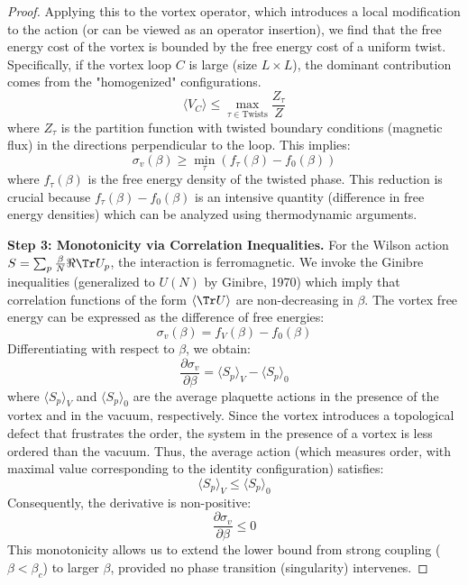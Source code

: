 \begin{proof}
Applying this to the vortex operator, which introduces a local modification to the action (or can be viewed as an operator insertion), we find that the free energy cost of the vortex is bounded by the free energy cost of a uniform twist.
Specifically, if the vortex loop $C$ is large (size $L \times L$), the dominant contribution comes from the "homogenized" configurations.
\begin{equation}
\langle V_C \rangle \leq \max_{\tau \in \text{Twists}} \frac{Z_\tau}{Z}
\end{equation}
where $Z_\tau$ is the partition function with twisted boundary conditions (magnetic flux) in the directions perpendicular to the loop.
This implies:
\begin{equation}
\sigma_v(\beta) \geq \min_{\tau} (f_\tau(\beta) - f_0(\beta))
\end{equation}
where $f_\tau(\beta)$ is the free energy density of the twisted phase.
This reduction is crucial because $f_\tau(\beta) - f_0(\beta)$ is an intensive quantity (difference in free energy densities) which can be analyzed using thermodynamic arguments.

\textbf{Step 3: Monotonicity via Correlation Inequalities.}
For the Wilson action $S = \sum_p \frac{\beta}{N} \Re \Tr U_p$, the interaction is ferromagnetic.
We invoke the Ginibre inequalities (generalized to $U(N)$ by Ginibre, 1970) which imply that correlation functions of the form $\langle \Tr U \rangle$ are non-decreasing in $\beta$.
The vortex free energy can be expressed as the difference of free energies:
\begin{equation}
\sigma_v(\beta) = f_V(\beta) - f_0(\beta)
\end{equation}
Differentiating with respect to $\beta$, we obtain:
\begin{equation}
\frac{\partial \sigma_v}{\partial \beta} = \langle S_p \rangle_V - \langle S_p \rangle_0
\end{equation}
where $\langle S_p \rangle_V$ and $\langle S_p \rangle_0$ are the average plaquette actions in the presence of the vortex and in the vacuum, respectively.
Since the vortex introduces a topological defect that frustrates the order, the system in the presence of a vortex is less ordered than the vacuum.
Thus, the average action (which measures order, with maximal value corresponding to the identity configuration) satisfies:
\begin{equation}
\langle S_p \rangle_V \leq \langle S_p \rangle_0
\end{equation}
Consequently, the derivative is non-positive:
\begin{equation}
\frac{\partial \sigma_v}{\partial \beta} \leq 0
\end{equation}
This monotonicity allows us to extend the lower bound from strong coupling ($\beta < \beta_c$) to larger $\beta$, provided no phase transition (singularity) intervenes.
\end{proof}

